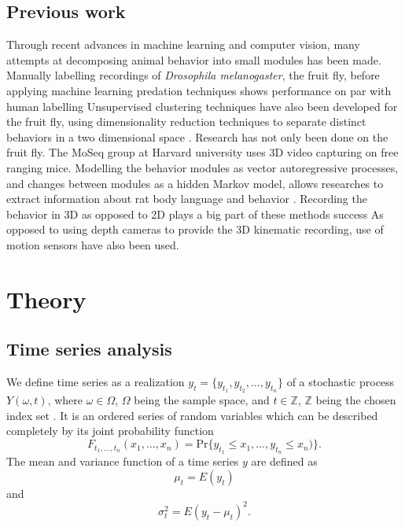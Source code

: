 \documentclass[a4paper, 10pt]{memoir}
\theoremstyle{plain}
\theoremstyle{definition}
\theoremstyle{remark}
\begin{document}
\section{Previous work}
Through recent advances in machine learning and computer vision, many attempts at decomposing animal behavior into small modules has been made.
Manually labelling recordings of \textit{Drosophila melanogaster}, the fruit fly, before applying machine learning predation techniques shows performance on par with human labelling \cite{kain}
Unsupervised clustering techniques have also been developed for the fruit fly, using dimensionality reduction techniques to separate distinct behaviors in a two dimensional space \cite{berman}.
Research has not only been done on the fruit fly.
The MoSeq group at Harvard university uses 3D video capturing on free ranging mice.
Modelling the behavior modules as vector autoregressive processes, and changes between modules as a hidden Markov model, allows researches to extract information about rat body language and behavior \cite{wiltschko}.
Recording the behavior in 3D as opposed to 2D plays a big part of these methods success \cite{marshall}
As opposed to using depth cameras to provide the 3D kinematic recording, use of motion sensors have also been used. 





\chapter{Theory}
\section{Time series analysis}
We define time series as a realization $y_t = \{ y_{t_1}, y_{t_2}, \hdots, y_{t_n} \}$ of a stochastic process $Y(\omega, t)$, where $\omega \in \Omega$, $\Omega$ being the sample space,  and $t \in \mathbb{Z}$, $\mathbb{Z}$ being the chosen index set  \cite{wei}.
It is an ordered series of random variables which can be described completely by its joint probability function
\begin{equation*}
        F_{t_1,\hdots, t_n}(x_1, \hdots, x_n) = \text{Pr}\{ y_{t_1} \leq x_{1}, \hdots, y_{t_n} \leq x_n) \}.
\end{equation*}
The mean and variance function of a time series $y$ are defined as
\begin{equation}\label{eq:mean_func}
        \mu_t = E(y_t)  
\end{equation}
and
\begin{equation*}
        \sigma_t^2 = E(y_t - \mu_t)^2.
\end{equation*}
\end{document}
